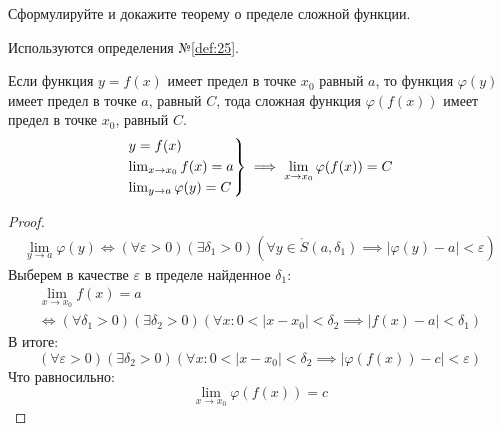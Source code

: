 \begin{question}
    Сформулируйте и докажите теорему о пределе сложной функции.
\end{question}
\begin{used}
    Используются определения №\ref{def:25}.
\end{used}
\begin{theorem}
    Если функция $y = f(x)$ имеет предел в точке  $x_0$ равный $a$, то функция  $\varphi(y)$ имеет предел в точке $a$, равный $C$, тода сложная функция  $\varphi(f(x))$ имеет предел в точке $x_0$, равный $C$.
    \begin{gather*}
        \begin{rcases}
            y = f(x) \\
            \lim_{x \to x_0} f(x) = a \\
            \lim_{y \to a} \varphi(y) = C \\
        \end{rcases}
        \implies \lim_{x \to x_0} \varphi(f(x)) = C
    \end{gather*}
\end{theorem}
\begin{proof}
    \begin{gather*}
        \lim_{y \to a} \varphi(y) \iff (\forall \varepsilon > 0)(\exists \delta_1 > 0)(\forall y \in \mathring{S}(a, \delta_1) \implies |\varphi(y) - a| < \varepsilon) \tag{1}
    \end{gather*}
    Выберем в качестве $\varepsilon$ в пределе найденное $\delta_1$:
    \begin{gather*}
        \lim_{x \to x_0} f(x) = a \\
        \iff (\forall \delta_1 > 0)(\exists \delta_2 > 0)(\forall x: 0 < |x - x_0| < \delta_2 \implies |f(x) - a| < \delta_1) \tag{2} 
    \end{gather*}
    В итоге: \[
        (\forall \varepsilon > 0)(\exists \delta_2 > 0)(\forall x: 0 < |x - x_0| < \delta_2 \implies |\varphi(f(x)) - c| < \varepsilon)
    \] 
    Что равносильно: \[
        \lim_{x \to x_0} \varphi(f(x)) = c
    \] 
\end{proof}
\pagebreak



